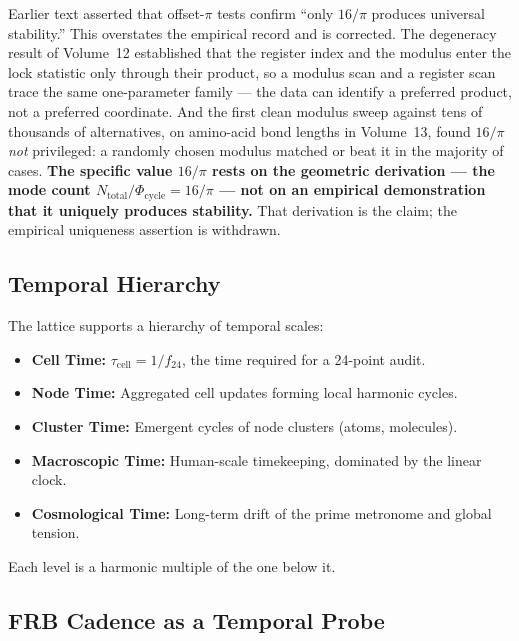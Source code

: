 \documentclass[12pt,oneside]{book}
\begin{document}
Earlier text asserted that offset-$\pi$ tests confirm ``only $16/\pi$ produces
universal stability.'' This overstates the empirical record and is corrected. The
degeneracy result of Volume~12 established that the register index and the modulus
enter the lock statistic only through their product, so a modulus scan and a
register scan trace the same one-parameter family --- the data can identify a
preferred product, not a preferred coordinate. And the first clean modulus sweep
against tens of thousands of alternatives, on amino-acid bond lengths in
Volume~13, found $16/\pi$ \emph{not} privileged: a randomly chosen modulus matched
or beat it in the majority of cases. \textbf{The specific value $16/\pi$ rests on
the geometric derivation --- the mode count $N_{\text{total}}/\Phi_{\text{cycle}}
= 16/\pi$ --- not on an empirical demonstration that it uniquely produces
stability.} That derivation is the claim; the empirical uniqueness assertion is
withdrawn.


\subsection{Temporal Hierarchy}

The lattice supports a hierarchy of temporal scales:

\begin{itemize}
    \item \textbf{Cell Time:}  
    \(\tau_{\text{cell}} = 1/f_{24}\), the time required for a 24-point audit.

    \item \textbf{Node Time:}  
    Aggregated cell updates forming local harmonic cycles.

    \item \textbf{Cluster Time:}  
    Emergent cycles of node clusters (atoms, molecules).

    \item \textbf{Macroscopic Time:}  
    Human-scale timekeeping, dominated by the linear clock.

    \item \textbf{Cosmological Time:}  
    Long-term drift of the prime metronome and global tension.
\end{itemize}

Each level is a harmonic multiple of the one below it.

\subsection{FRB Cadence as a Temporal Probe}
\end{document}
